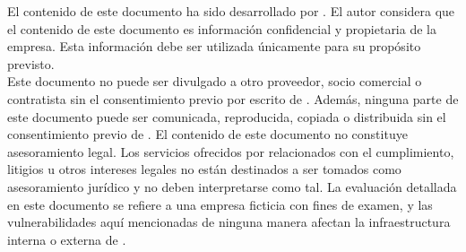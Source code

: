 { \tab El contenido de este documento ha sido desarrollado por \brandName. El autor considera que el contenido de este
documento es información confidencial y propietaria de la empresa. Esta información debe ser utilizada únicamente para su propósito previsto.\\
Este documento no puede ser divulgado a otro proveedor, socio comercial o contratista sin el consentimiento previo por escrito de \brandName. Además, ninguna parte de este documento puede ser comunicada, reproducida,
copiada o distribuida sin el consentimiento previo de \brandName.
El contenido de este documento no constituye asesoramiento legal. Los servicios ofrecidos por \brandName relacionados con el cumplimiento, litigios u otros intereses legales no están destinados a ser tomados como asesoramiento jurídico y no deben interpretarse como tal. La evaluación detallada en este documento se refiere a una empresa ficticia con fines de examen, y las vulnerabilidades aquí mencionadas de ninguna manera afectan la infraestructura interna o externa de \enterpriseName. }


